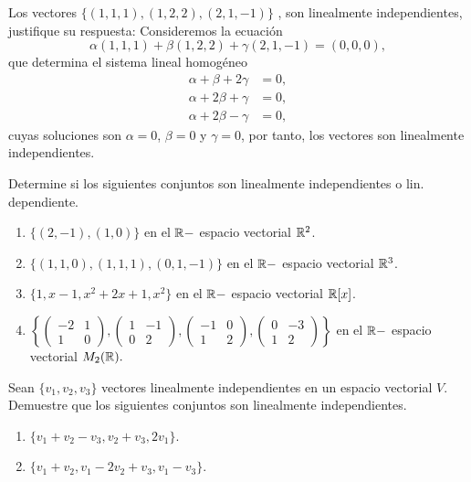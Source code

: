 \begin{ejem}
Los vectores $\{(1,1,1) , (1,2,2) , (2,1,-1)\}$ , son linealmente independientes, justifique su
respuesta:
Consideremos la ecuación 
\[\alpha (1,1,1 ) + \beta ( 1,2,2 ) + \gamma ( 2,1,-1) = ( 0, 0,0 ) ,\]
que determina el sistema lineal homogéneo 
\begin{align*}
    \alpha + \beta + 2\gamma &= 0,\\ \alpha + 2\beta + \gamma &= 0,\\ \alpha + 2\beta - \gamma &= 0,
\end{align*} cuyas soluciones son $ \alpha  = 0 $, $\beta = 0$ y $\gamma = 0$, por tanto, los
vectores son linealmente independientes.
\end{ejem}

\begin{ejer}
Determine si los siguientes conjuntos son linealmente independientes o lin. dependiente.
\begin{enumerate}
    \item $\{(2, -1), (1,0)\}$ en el $\mathbb{R}-$ espacio vectorial $\mathbb{R}^2$.
    \item $\{(1,1,0), (1,1,1), (0,1, -1)\}$ en el $\mathbb{R}-$ espacio vectorial $\mathbb{R}^3$.
    \item $\{ 1, x -1, x^2 + 2x + 1, x^2\}$ en el $\mathbb{R}-$ espacio vectorial $\mathbb{R}[x]$.
    \item $\left\{\begin{pmatrix} -2 & 1 \\ 1 & 0 \end{pmatrix},\begin{pmatrix} 1 & -1 \\ 0 & 2 \end{pmatrix},\begin{pmatrix} -1 & 0 \\ 1 & 2 \end{pmatrix},\begin{pmatrix} 0 & -3 \\ 1 & 2 \end{pmatrix}\right\}$ en el $\mathbb{R}-$ espacio vectorial $M_{2}(\mathbb{R}).$
\end{enumerate}
\end{ejer}

\begin{ejer}
Sean $\{v_1, v_2, v_3\}$ vectores linealmente independientes en un espacio vectorial $V$. Demuestre que los siguientes conjuntos son linealmente independientes.
\begin{enumerate}
    \item $\{ v_1 + v_2- v_3, v_2+ v_3, 2v_1\}$.
\item $\{ v_1 + v_2, v_1 - 2v_2 + v_3, v_1 - v_3\}$.
\end{enumerate}
\end{ejer}

